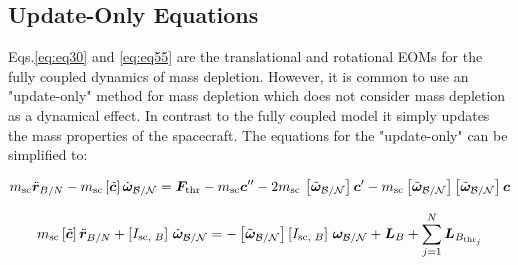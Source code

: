 


\subsection{Update-Only Equations}

Eqs.\eqref{eq:eq30} and \eqref{eq:eq55} are the translational and rotational EOMs for the fully coupled dynamics of mass depletion. However, it is common to use an "update-only" method for mass depletion which does not consider mass depletion as a dynamical effect. In contrast to the fully coupled model it simply updates the mass properties of the spacecraft. The equations for the "update-only" can be simplified to:

\begin{equation}\label{eq:eq31}
m_{\text{sc}} \ddot{\bm{r}}_{B/N} - m_{\text{sc}} \left[\tilde{\bm{c}}\right]\dot{\bm{\omega}}_{\cal{B}/\cal{N}} =  \bm{F}_{\text{thr}} - m_{\text{sc}} \bm{c}''-2 m_{\text{sc}} \,\left[\tilde{\bm{\omega}}_{\cal{B}/\cal{N}}\right]
\bm{c}' - m_{\text{sc}} \left[\tilde{\bm{\omega}}_{\cal{B}/\cal{N}}\right] \left[\tilde{\bm{\omega}}_{\cal{B}/\cal{N}}\right] \bm{c} 
\end{equation}

\begin{equation}\label{eq:eq55}
m_{\text{sc}} \left[\tilde{\bm{c}}\right]\ddot{\bm{r}}_{B/N} + \left[I_{\text{sc, }B}\right]\,\dot{\bm{\omega}}_{\cal{B}/\cal{N}} = - \left[\tilde{\bm{\omega}}_{\cal{B}/\cal{N}}\right]\left[I_{\text{sc, }B}\right]\,\bm{\omega}_{\cal{B}/\cal{N}}
+ \bm{L}_{B} + \sum_{j=1}^{N}\bm{L}_{B_{\text{thr}_j}} 
\end{equation}



